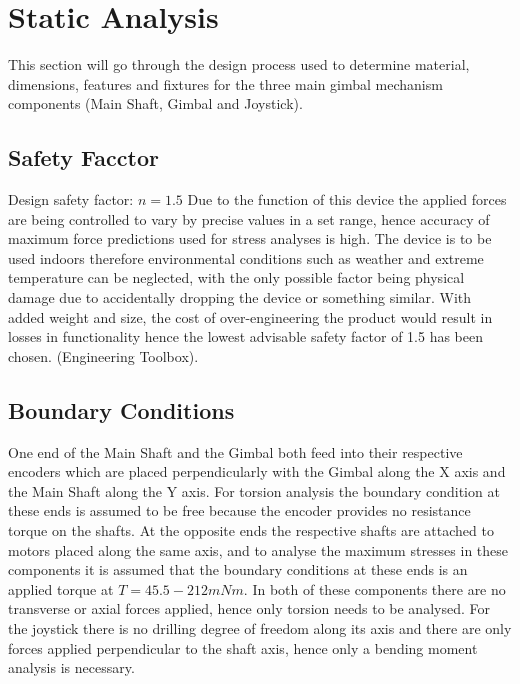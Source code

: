 \section{Static Analysis} %
\label{sec:static_analysis}

This section will go through the design process used to determine material, dimensions, features and fixtures for the three main gimbal mechanism components (Main Shaft, Gimbal and Joystick).

\subsection{Safety Facctor} %
\label{sub:safety_facctor}

Design safety factor: $n = 1.5$
Due to the function of this device the applied forces are being controlled to vary by precise values in a set range, hence accuracy of maximum force predictions used for stress analyses is high. The device is to be used indoors therefore environmental conditions such as weather and extreme temperature can be neglected, with the only possible factor being physical damage due to accidentally dropping the device or something similar. With added weight and size, the cost of over-engineering the product would result in losses in functionality hence the lowest advisable safety factor of 1.5 has been chosen. (Engineering Toolbox).



\subsection{Boundary Conditions} %
\label{sub:boundary_conditions}

One end of the Main Shaft and the Gimbal both feed into their respective encoders which are placed perpendicularly with the Gimbal along the X axis and the Main Shaft along the Y axis. For torsion analysis the boundary condition at these ends is assumed to be free because the encoder provides no resistance torque on the shafts. At the opposite ends the respective shafts are attached to motors placed along the same axis, and to analyse the maximum stresses in these components it is assumed that the boundary conditions at these ends is an applied torque at $T = 45.5 - 212 mNm$. In both of these components there are no transverse or axial forces applied, hence only torsion needs to be analysed. For the joystick there is no drilling degree of freedom along its axis and there are only forces applied perpendicular to the shaft axis, hence only a bending moment analysis is necessary.

